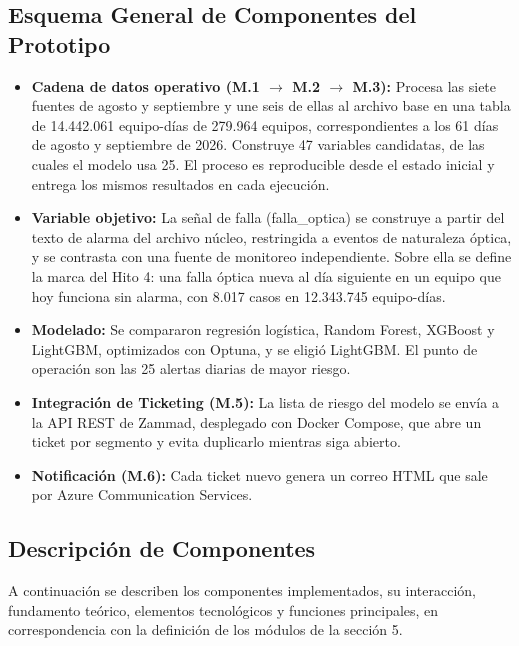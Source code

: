 \documentclass[12pt,a4paper]{article}
\begin{document}
\subsection{Esquema General de Componentes del Prototipo}

\begin{itemize}
    \item \textbf{Cadena de datos operativo (M.1 $\rightarrow$ M.2 $\rightarrow$ M.3):} Procesa las siete fuentes de agosto y septiembre y une seis de ellas al archivo base en una tabla de 14.442.061 equipo-días de 279.964 equipos, correspondientes a los 61 días de agosto y septiembre de 2026. Construye 47 variables candidatas, de las cuales el modelo usa 25. El proceso es reproducible desde el estado inicial y entrega los mismos resultados en cada ejecución.

    \item \textbf{Variable objetivo:} La señal de falla (falla\_optica) se construye a partir del texto de alarma del archivo núcleo, restringida a eventos de naturaleza óptica, y se contrasta con una fuente de monitoreo independiente. Sobre ella se define la marca del Hito 4: una falla óptica nueva al día siguiente en un equipo que hoy funciona sin alarma, con 8.017 casos en 12.343.745 equipo-días.

    \item \textbf{Modelado:} Se compararon regresión logística, Random Forest, XGBoost y LightGBM, optimizados con Optuna, y se eligió LightGBM. El punto de operación son las 25 alertas diarias de mayor riesgo.

    \item \textbf{Integración de Ticketing (M.5):} La lista de riesgo del modelo se envía a la API REST de Zammad, desplegado con Docker Compose, que abre un ticket por segmento y evita duplicarlo mientras siga abierto.

    \item \textbf{Notificación (M.6):} Cada ticket nuevo genera un correo HTML que sale por Azure Communication Services.
\end{itemize}



\subsection{Descripción de Componentes}
\noindent
A continuación se describen los componentes implementados, su interacción, fundamento teórico, elementos tecnológicos y funciones principales, en correspondencia con la definición de los módulos de la sección 5.
\end{document}
